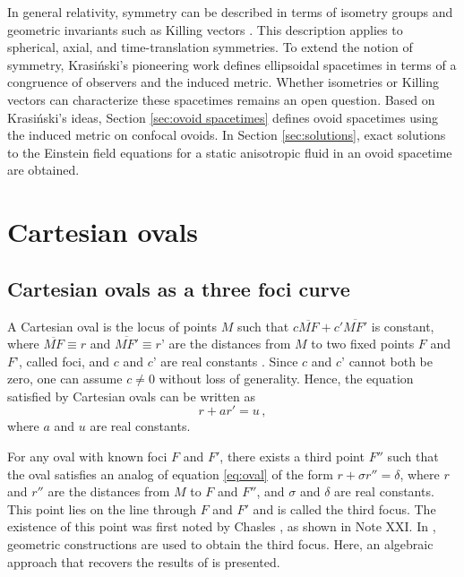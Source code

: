 \documentclass[12pt, ams, nofootinbib]{revtex4}
\def\be{\begin{equation}}
\def\ee{\end{equation}}
\theoremstyle{definition}
\begin{document}
In general relativity, symmetry can be described in terms of isometry groups and geometric invariants such as Killing vectors \cite{StephaniKramer2003}. This description applies to spherical, axial, and time-translation symmetries. To extend the notion of symmetry, Krasiński's pioneering work \cite{Krasinski1978} defines ellipsoidal spacetimes in terms of a congruence of observers and the induced metric. Whether isometries or Killing vectors can characterize these spacetimes remains an open question. Based on Krasiński's ideas, Section \ref{sec:ovoid spacetimes} defines ovoid spacetimes using the induced metric on confocal ovoids. In Section \ref{sec:solutions}, exact solutions to the Einstein field equations for a static anisotropic fluid in an ovoid spacetime are obtained.

\section{Cartesian ovals} %
\label{sec:Cartesian ovals}

\subsection{Cartesian ovals as a three foci curve}

A Cartesian oval is the locus of points $M$ such that $c\overline{MF}+c'\overline{MF'}$ is constant, where $\overline{MF}\equiv r$ and $\overline{MF'} \equiv r’$ are the distances from $M$ to two fixed points $F$ and $F’$, called foci, and $c$ and $c’$ are real constants \cite{williamson1873, johnson1875bipolar}. Since $c$ and $c’$ cannot both be zero, one can assume $c\neq 0$ without loss of generality. Hence, the equation satisfied by Cartesian ovals can be written as
\be 
	r+ar' = u\,, \label{eq:oval}
\ee
where $a$ and $u$ are real constants. 

For any oval with known foci $F$ and $F'$, there exists a third point $F''$ such that the oval satisfies an analog of equation \ref{eq:oval} of the form $r+\sigma r''=\delta$, where $r$ and $r''$ are the distances from $M$ to $F$ and $F''$, and $\sigma$ and $\delta$ are real constants. This point lies on the line through $F$ and $F'$ and is called the third focus. The existence of this point was first noted by Chasles \cite{chasles1837}, as shown in Note XXI. In \cite{chasles1837, williamson1873}, geometric constructions are used to obtain the third focus. Here, an algebraic approach that recovers the results of \cite{johnson1875bipolar} is presented.
\end{document}
